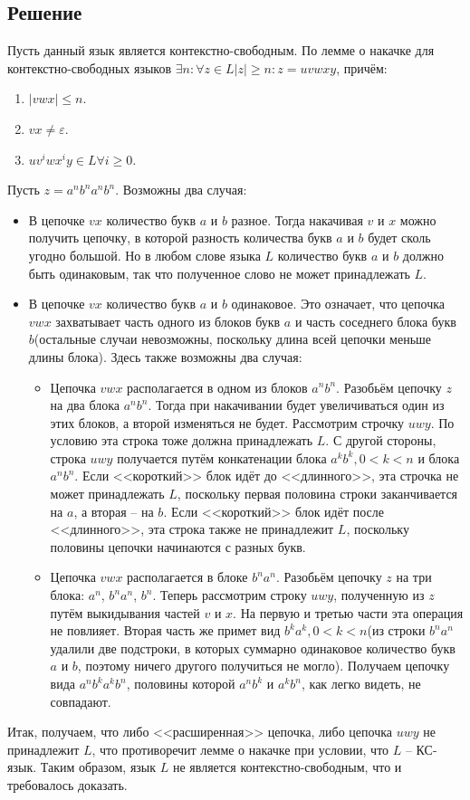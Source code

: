 \documentclass[11pt]{article}
\begin{document}
\subsection{Решение}
\label{sec:orgd43007c}
Пусть данный язык является контекстно-свободным. По лемме о накачке для контекстно-свободных
языков \(\exists n: \forall z \in L |z| \geq n: z = uvwxy\), причём:
\begin{enumerate}
\item \(|vwx| \leq n\).
\item \(vx \neq \varepsilon\).
\item \(uv^iwx^iy \in L \forall i \geq 0\).
\end{enumerate}
Пусть \(z = a^nb^na^nb^n\). Возможны два случая:
\begin{itemize}
\item В цепочке \(vx\) количество букв \(a\) и \(b\) разное. Тогда накачивая \(v\) и \(x\) можно получить цепочку, в которой разность количества букв \(a\) и \(b\) будет сколь угодно большой. Но в любом слове языка \(L\) количество букв \(a\) и \(b\) должно быть одинаковым, так что полученное слово не может принадлежать \(L\).
\item В цепочке \(vx\) количество букв \(a\) и \(b\) одинаковое. Это означает, что цепочка \(vwx\) захватывает часть одного из блоков букв \(a\) и часть соседнего блока букв \(b\)(остальные случаи невозможны, поскольку длина всей цепочки меньше длины блока). Здесь также возможны два случая:
\begin{itemize}
\item Цепочка \(vwx\) располагается в одном из блоков \(a^nb^n\). Разобьём цепочку \(z\) на два блока \(a^nb^n\). Тогда при накачивании будет увеличиваться один из этих блоков, а второй изменяться не будет. Рассмотрим строчку \(uwy\). По условию эта строка тоже должна принадлежать \(L\). С другой стороны, строка \(uwy\) получается путём конкатенации блока \(a^kb^k, 0 < k < n\) и блока \(a^nb^n\). Если {}<<короткий>>{} блок идёт до {}<<длинного>>{}, эта строчка не может принадлежать \(L\), поскольку первая половина строки заканчивается на \(a\), а вторая -- на \(b\). Если {}<<короткий>>{} блок идёт после {}<<длинного>>{}, эта строка также не принадлежит \(L\), поскольку половины цепочки начинаются с разных букв.
\item Цепочка \(vwx\) располагается в блоке \(b^na^n\). Разобьём цепочку \(z\) на три блока: \(a^n\), \(b^na^n\), \(b^n\). Теперь рассмотрим строку \(uwy\), полученную из \(z\) путём выкидывания частей \(v\) и \(x\). На первую и третью части эта операция не повлияет. Вторая часть же примет вид \(b^ka^k, 0 < k < n\)(из строки \(b^na^n\) удалили две подстроки, в которых суммарно одинаковое количество букв \(a\) и \(b\), поэтому ничего другого получиться не могло). Получаем цепочку вида \(a^nb^ka^kb^n\), половины которой \(a^nb^k\) и \(a^kb^n\), как легко видеть, не совпадают.
\end{itemize}
\end{itemize}
Итак, получаем, что либо {}<<расширенная>>{} цепочка, либо цепочка \(uwy\) не принадлежит \(L\), что противоречит лемме о накачке при условии, что \(L\) -- КС-язык. Таким образом, язык \(L\) не является контекстно-свободным, что и требовалось доказать.
\end{document}
